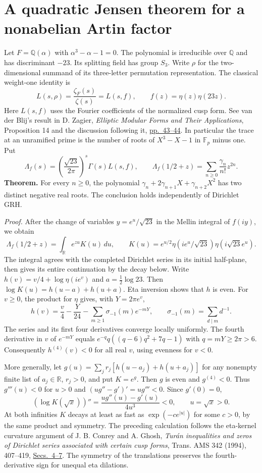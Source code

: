 \section{A quadratic Jensen theorem for a nonabelian Artin factor}
\label{sec:eta-jensen}
Let $F=\mathbb Q(\alpha)$ with $\alpha^3-\alpha-1=0$. The polynomial is
irreducible over $\mathbb Q$ and has discriminant $-23$. Its splitting
field has group $S_3$. Write $\rho$ for the two-dimensional summand of its
three-letter permutation representation. The classical weight-one identity is
\[
 L(s,\rho)=\frac{\zeta_F(s)}{\zeta(s)}=L(s,f),
 \qquad f(z)=\eta(z)\eta(23z).
\]
Here $L(s,f)$ uses the Fourier coefficients of the normalized cusp form.
See van der Blij's result in D. Zagier, \emph{Elliptic Modular Forms and
Their Applications}, Proposition 14 and the discussion following it,
\href{https://www.its.caltech.edu/~matilde/Zagier123ModularForms.pdf}{pp.~43--44}.
In particular the trace at an unramified prime is the number of roots of
$X^3-X-1$ in $\mathbb F_p$ minus one.
Put
\[
 \Lambda_f(s)=\left(\frac{\sqrt{23}}{2\pi}\right)^s\Gamma(s)L(s,f),
 \qquad
 \Lambda_f(1/2+z)=\sum_{n\ge0}\frac{\gamma_n}{n!}z^{2n}.
\]
\textbf{Theorem.} For every $n\ge0$, the polynomial
$\gamma_n+2\gamma_{n+1}X+\gamma_{n+2}X^2$ has two distinct negative
real roots. The conclusion holds independently of Dirichlet GRH.

\textit{Proof.}
After the change of variables $y=e^u/\sqrt{23}$ in the Mellin integral
of $f(iy)$, we obtain
\[
 \Lambda_f(1/2+z)=\int_{\mathbb R}e^{zu}K(u)\,du,
 \qquad K(u)=e^{u/2}\eta(ie^u/\sqrt{23})\eta(i\sqrt{23}e^u).
\]
The integral agrees with the completed Dirichlet series in its initial
half-plane, then gives its entire continuation by the decay below.
Write $h(v)=v/4+\log\eta(ie^v)$ and $a=\frac12\log23$. Then
$\log K(u)=h(u-a)+h(u+a)$. Eta inversion shows that $h$ is even.
For $v\ge0$, the product for $\eta$ gives, with $Y=2\pi e^v$,
\[
 h(v)=\frac v4-\frac Y{24}
       -\sum_{m\ge1}\sigma_{-1}(m)e^{-mY},\qquad
 \sigma_{-1}(m)=\sum_{d\mid m}d^{-1}.
\]
The series and its first four derivatives converge locally uniformly.
The fourth derivative in $v$ of $e^{-mY}$ equals
$e^{-q}q((q-6)q^2+7q-1)$ with $q=mY\ge 2\pi>6$. Consequently
$h^{(4)}(v)<0$ for all real $v$, using evenness for $v<0$.

More generally, let $g(u)=\sum_j r_j[h(u-a_j)+h(u+a_j)]$ for any
nonempty finite list of $a_j\in\mathbb R$, $r_j>0$, and put $K=e^g$.
Then $g$ is even and $g^{(4)}<0$. Thus $g'''(u)<0$ for $u>0$ and
$(u g''-g')'=u g'''<0$. Since $g'(0)=0$,
\[
 \left(\log K(\sqrt{x})\right)''
 =\frac{u g''(u)-g'(u)}{4u^3}<0,\qquad u=\sqrt x>0 .
\]
At both infinities $K$ decays at least as fast as $\exp(-c e^{|u|})$
for some $c>0$, by the same product and symmetry. The preceding
calculation follows the eta-kernel curvature argument of J. B. Conrey
and A. Ghosh, \emph{Tur\'an inequalities and zeros of Dirichlet series
associated with certain cusp forms}, Trans. AMS 342 (1994), 407--419,
\href{https://aimath.org/~kaur/publications/29.pdf}{Secs.~4--7}.
The symmetry of the translations preserves the fourth-derivative sign
for unequal eta dilations.


